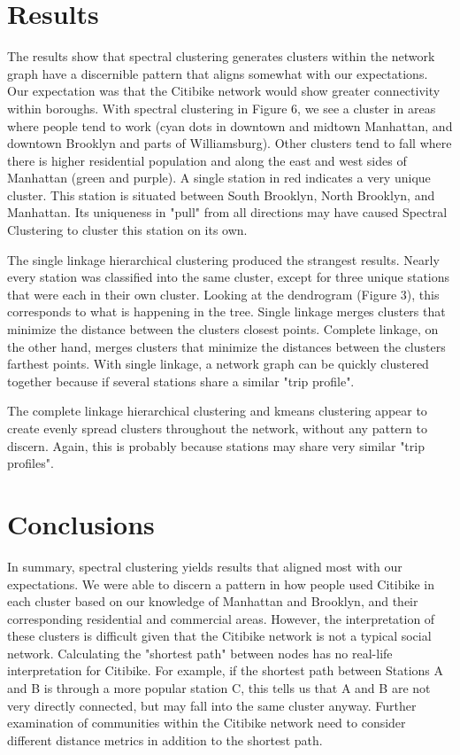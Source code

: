\documentclass[10pt,twocolumn]{article}
\begin{document}
\section{Results}
The results show that spectral clustering generates clusters within the network
graph have a discernible pattern that aligns somewhat with our expectations. Our expectation
was that the Citibike
network would show greater connectivity within boroughs. With spectral clustering in Figure 6,
we see a cluster in areas where people tend to work (cyan dots in
downtown and midtown Manhattan,
and downtown Brooklyn and parts of Williamsburg). Other clusters tend to fall where
there is higher residential population and along the east and west sides of
Manhattan (green and purple). A single station in red indicates a very unique cluster.
This station is situated between South Brooklyn, North Brooklyn, and Manhattan. Its
uniqueness in "pull" from all directions may have caused Spectral Clustering to cluster
this station on its own.

The single linkage hierarchical clustering produced the strangest results. Nearly
every station was classified into the same cluster, except for three unique stations
that were each in their own cluster. Looking at the dendrogram (Figure 3), this
corresponds to what is happening in the tree. Single linkage merges clusters
that minimize the distance between the clusters closest points. Complete linkage,
on the other hand, merges clusters that minimize the distances between the clusters
farthest points. With single linkage, a network graph can be quickly clustered together
because if several stations share a similar "trip profile".

The complete linkage hierarchical clustering and kmeans clustering appear to create
evenly spread clusters throughout the network, without any pattern to discern. Again,
this is probably because stations may share very similar "trip profiles".

\section{Conclusions}

In summary, spectral clustering yields results that aligned most with our expectations.
We were able to discern a pattern in how people used Citibike in each cluster based
on our knowledge of Manhattan and Brooklyn, and their corresponding residential and
commercial areas. However, the interpretation of these clusters is difficult given
that the Citibike network is not a typical social network.
Calculating the "shortest path" between nodes has no real-life interpretation for
Citibike. For example, if the shortest path between Stations A and B is through
a more popular station C, this tells us that A and B are not very directly connected, but
may fall into the same cluster anyway. Further examination of communities within
the Citibike network need to consider different distance metrics in addition
to the shortest path.
\end{document}
